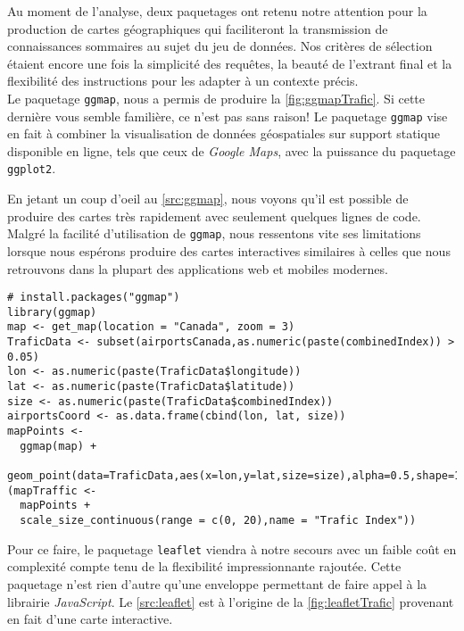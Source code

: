 Au moment de l'analyse, deux paquetages ont retenu notre attention pour la production de cartes géographiques qui faciliteront la transmission de connaissances sommaires au sujet du jeu de données. Nos critères de sélection étaient encore une fois la simplicité des requêtes, la beauté de l'extrant final et la flexibilité des instructions pour les adapter à un contexte précis. \\

Le paquetage \texttt{ggmap}, nous a permis de produire la \autoref{fig:ggmapTrafic}. Si cette dernière vous semble familière, ce n'est pas sans raison! Le paquetage \texttt{ggmap} vise en fait à combiner la visualisation de données géospatiales sur support statique disponible en ligne, tels que ceux de \emph{Google Maps}, avec la puissance du paquetage \texttt{ggplot2}. \cite{Rpackage:ggmap} \\


En jetant un coup d'oeil au \autoref{src:ggmap}, nous voyons qu'il est possible de produire des cartes très rapidement avec seulement quelques lignes de code. Malgré la facilité d'utilisation de \texttt{ggmap}, nous ressentons vite ses limitations lorsque nous espérons produire des cartes interactives similaires à celles que nous retrouvons dans la plupart des applications web et mobiles modernes. \\

\begin{lstlisting}[caption = Générer une carte du trafic aérien avec \texttt{ggmap},label=src:ggmap]
# install.packages("ggmap")
library(ggmap)
map <- get_map(location = "Canada", zoom = 3)
TraficData <- subset(airportsCanada,as.numeric(paste(combinedIndex)) > 0.05)
lon <- as.numeric(paste(TraficData$longitude))
lat <- as.numeric(paste(TraficData$latitude))
size <- as.numeric(paste(TraficData$combinedIndex))
airportsCoord <- as.data.frame(cbind(lon, lat, size))
mapPoints <- 
  ggmap(map) + 
  geom_point(data=TraficData,aes(x=lon,y=lat,size=size),alpha=0.5,shape=16)
(mapTraffic <-  
  mapPoints + 
  scale_size_continuous(range = c(0, 20),name = "Trafic Index"))
\end{lstlisting}

\vspace{\baselineskip}
Pour ce faire, le paquetage \texttt{leaflet} \cite{leaflet} viendra à notre secours avec un faible coût en complexité compte tenu de la flexibilité impressionnante rajoutée. Cette paquetage n'est rien d'autre qu'une enveloppe permettant de faire appel à la librairie \emph{JavaScript}. \cite{leafletjs} Le \autoref{src:leaflet} est à l'origine de la \autoref{fig:leafletTrafic} provenant en fait d'une carte interactive. \\

